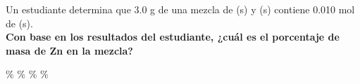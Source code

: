 Un estudiante determina que 3.0 g de una mezcla de (s) y (s) contiene 0.010 mol de (s).\\
\textbf{Con base en los resultados del estudiante, ¿cuál es el porcentaje de masa de Zn en la mezcla?}\\

\begin{choices}
    \%
    \%
    \%
    \%
\end{choices}